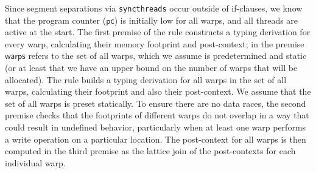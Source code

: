 Since segment separations via \texttt{syncthreads} occur outside of if-clauses, we know that the program counter ($\mathsf{pc}$) is initially low for all warps, and all threads are active at the start.
%
The first premise of the rule constructs a typing derivation for every warp, calculating their memory footprint and post-context; in the premise $\mathsf{warps}$ refers to the set of all warps, which we assume is predetermined and static (or at least that we have an upper bound on the number of warps that will be allocated).
% 
The rule builds a typing derivation for all warps in the set of all warps, calculating their footprint and also their post-context. We assume that the set of all warps is preset statically.
%
To ensure there are no data races, the second premise checks that the footprints of different warps do not overlap in a way that could result in undefined behavior, particularly when at least one warp performs a write operation on a particular location.
%
 The post-context for all warps is then computed in the third premise as the lattice join of the post-contexts for each individual warp.


%


